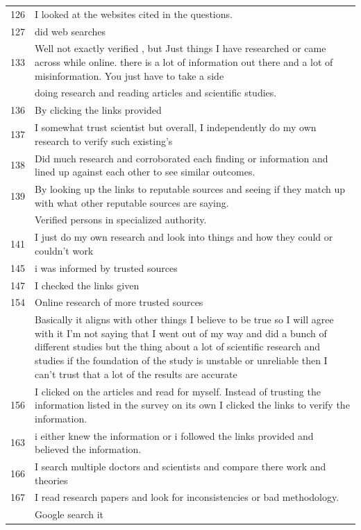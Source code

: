 \documentclass[
  doc,floatsintext]{apa6}
\begin{document}
\begin{longtable}[t]{>{}r>{\raggedright\arraybackslash}p{30em}}
126 & I looked at the websites cited in the questions.\\
127 & did web searches\\
133 & Well not exactly verified , but Just things I have researched or came across while online. there is a lot of information out there and a lot of misinformation. You just have to take a side\\
\addlinespace
135 & doing research and reading articles and scientific studies.\\
136 & By clicking the links provided\\
137 & I somewhat trust scientist but overall, I independently do my own research to verify such existing's\\
138 & Did much research and corroborated each finding or information and lined up against each other to see similar outcomes.\\
139 & By looking up the links to reputable sources and seeing if they match up with what other reputable sources are saying.\\
\addlinespace
140 & Verified persons in specialized authority.\\
141 & I just do my own research and look into things and how they could or couldn’t work\\
145 & i was informed  by trusted sources\\
147 & I checked the links given\\
154 & Online research of more trusted sources\\
\addlinespace
155 & Basically it aligns with other things I believe to be true so I will agree with it I'm not saying that I went out of my way and did a bunch of different studies but the thing about a lot of scientific research and studies if the foundation of the study is unstable or unreliable then I can't trust that a lot of the results are accurate\\
156 & I clicked on the articles and read for myself. Instead of trusting the information listed in the survey on its own I clicked the links to verify the information.\\
163 & i either knew the information or i followed the links provided and believed the information.\\
166 & I search multiple doctors and scientists and compare there work and theories\\
167 & I read research papers and look for inconsistencies or bad methodology.\\
\addlinespace
170 & Google search it\\

\end{longtable}
\end{document}
